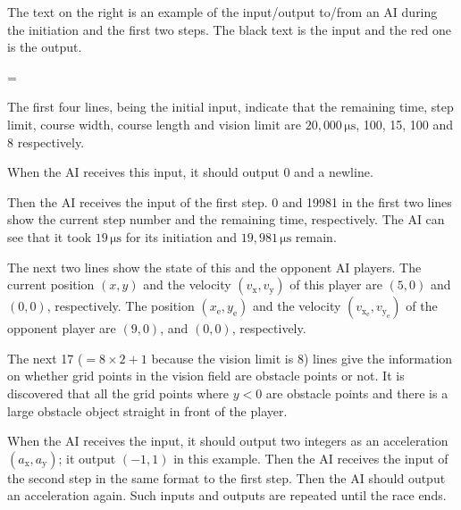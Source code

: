 \documentclass[11pt]{article}
\begin{document}
\begin{minipage}[t]{.6\textwidth}

The text on the right is an example of the input/output to/from an AI
during the initiation and the first two steps.
The black text is the input and the red one is the output.

\parindent=

The first four lines, being the initial input, indicate that
the remaining time, step limit, course width, course length and vision limit
are $20,000\,\si{\micro\second}$, 100, 15, 100 and 8 respectively.

When the AI receives this input, it should output 0 and a newline.

Then the AI receives the input of the first step.
0 and 19981 in the first two lines show the current step number
and the remaining time, respectively.
The AI can see that it took $19\,\si{\micro\second}$ for its initiation and
$19,981\,\si{\micro\second}$ remain.

The next two lines show the state of this and the opponent AI players.
The current position $(x,y)$ and the velocity $(v_\mathrm{x},v_\mathrm{y})$ of this player are $(5,0)$ and
$(0,0)$, respectively.
The position $(x_\mathrm{e},y_\mathrm{e})$ and the velocity $(v_{\mathrm{x}_\mathrm{e}},v_{\mathrm{y}_\mathrm{e}})$ of the opponent player are
$(9,0)$, and $(0,0)$, respectively.

The next 17 ($=8 \times 2 + 1$ because the vision limit is 8) lines give the information on whether grid points in the vision field are obstacle points or not.
It is discovered that all the grid points where $y < 0$ are obstacle points
and there is a large obstacle object straight in front of the player.

When the AI receives the input, it should output two integers as an acceleration $(a_\mathrm{x}, a_\mathrm{y})$;
it output $(-1,1)$ in this example.
Then the AI receives the input of the second step
in the same format to the first step.
Then the AI should output an acceleration again.
Such inputs and outputs are repeated until the race ends.

\end{minipage}
 \hfill
\end{document}

